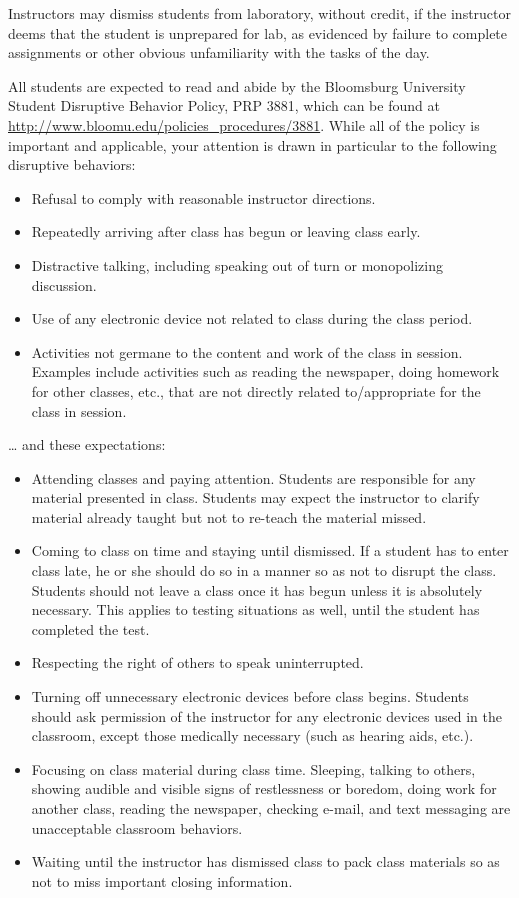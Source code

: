 \documentclass[10pt,letterpaper]{article}
\begin{document}
Instructors may dismiss students from laboratory, without credit, if the
instructor deems that the student is unprepared for lab, as evidenced by
failure to complete assignments or other obvious unfamiliarity with the tasks
of the day.

All students are expected to read and abide by the Bloomsburg University
Student Disruptive Behavior Policy, PRP 3881, which can be found at
\url{http://www.bloomu.edu/policies_procedures/3881}. While all of the policy is
important and applicable, your attention is drawn in particular to the
following disruptive behaviors:
\begin{itemize}[noitemsep]
	\item Refusal to comply with reasonable instructor directions.
	\item Repeatedly arriving after class has begun or leaving class early.
	\item Distractive talking, including speaking out of turn or monopolizing discussion.
	\item Use of any electronic device not related to class during the class period.
	\item Activities not germane to the content and work of the class in
		session. Examples include activities such as reading the
		newspaper, doing homework for other classes, etc., that are not
		directly related to/appropriate for the class in session.
\end{itemize}
\ldots{} and these expectations:
\begin{itemize}
	\item Attending classes and paying attention. Students are responsible
		for any material presented in class. Students may expect the
		instructor to clarify material already taught but not to
		re-teach the material missed.
	\item Coming to class on time and staying until dismissed. If a student
		has to enter class late, he or she should do so in a manner so
		as not to disrupt the class. Students should not leave a class
		once it has begun unless it is absolutely necessary. This
		applies to testing situations as well, until the student has
		completed the test. 
	\item Respecting the right of others to speak uninterrupted.
	\item Turning off unnecessary electronic devices before class begins.
		Students should ask permission of the instructor for any
		electronic devices used in the classroom, except those
		medically necessary (such as hearing aids, etc.). 
	\item Focusing on class material during class time. Sleeping, talking
		to others, showing audible and visible signs of restlessness or
		boredom, doing work for another class, reading the newspaper,
		checking e-mail, and text messaging are unacceptable classroom
		behaviors. 
	\item Waiting until the instructor has dismissed class to pack class
		materials so as not to miss important closing information.
\end{itemize}
\end{document}
